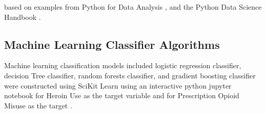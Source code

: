 \documentclass[sigconf]{acmart}
\begin{document}
based on examples from Python for Data Analysis \cite{mckinney17}, and the 
Python Data Science Handbook \cite{vanderplas17}.  

\subsection{Machine Learning Classifier Algorithms}
Machine learning classification models included logistic regression classifier, 
decision Tree classifier, random forests classifier, and gradient boosting 
classifier were constructed using SciKit Learn \cite{muller17, raschka17} 
using an interactive python jupyter notebook for Heroin Use as the target
variable \cite{classifyH} and for Prescription Opioid Misuse as the target
\cite{classifyPRL}. 





%
\end{document}

